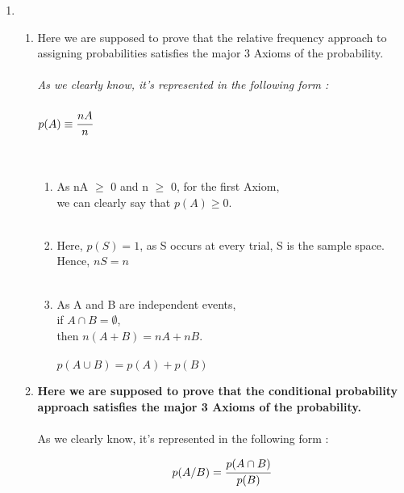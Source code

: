 \documentclass{article}
\begin{document}
\begin{enumerate}
\newpage

\item \large 
\begin{enumerate}
	\item {Here we are supposed to prove that the relative frequency approach to assigning probabilities satisfies the major 3 Axioms of the probability.} \\\\  
        \textit{As we clearly know, it's represented in the following form : }\\\\

        $p(A) \equiv \cfrac{nA}{n}$\\\\\

        \begin{enumerate}
            \item  As nA $\geq$ 0 and n $\geq$ 0, for the first Axiom, \\
            we can clearly say that $p(A) \geq 0.$ \\\ 
            \item Here, $p(S) = 1 $, as S occurs at every trial, S is the sample space. \\
            Hence, $nS = n$ \\\ 
            \item As A and B are independent events, \\
            if $ A \cap B = \emptyset $, \\ 
            then $ n(A + B) = nA + nB .$ \\\\ 
            \therefore \hspace{3mm} $p(A \cup B) = p(A) + p(B)$ \\ 
        \end{enumerate}
        \newpage 

        \item \textbf{Here we are supposed to prove that the conditional probability approach satisfies the major 3 Axioms of the probability.} \\\\  
        As we clearly know, it's represented in the following form :  

          \begin{gather}
        p(A / B) = \cfrac{p(A \cap B)}{p(B)} \nonumber
        \end{gather} \\ 


\end{enumerate}
\end{enumerate}
\end{document}
